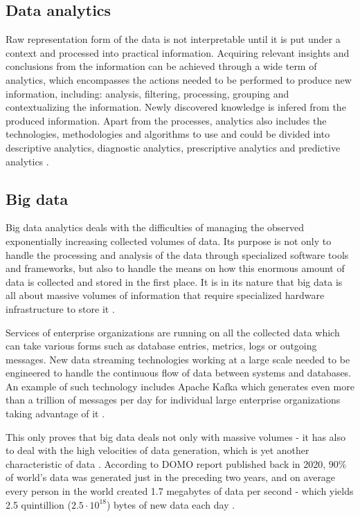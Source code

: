 \documentclass[a4paper,twoside,12pt]{book}
\begin{document}
\subsection{Data analytics}
Raw representation form of the data is not interpretable until it is put under a context and processed into practical information.
Acquiring relevant insights and conclusions from the information can be achieved through a wide term of analytics, which encompasses the actions needed to be performed to produce new information, including: analysis, filtering, processing, grouping and contextualizing the information. Newly discovered knowledge is infered from the produced information.
Apart from the processes, analytics also includes the technologies, methodologies and algorithms to use and could be divided into descriptive analytics, diagnostic analytics, prescriptive analytics and predictive analytics \cite{bib:big_data_analytics}.

\subsection{Big data}

Big data analytics deals with the difficulties of managing the observed exponentially increasing collected volumes of data. Its purpose is not only to handle the processing and analysis of the data through specialized software tools and frameworks, but also to handle the means on how this enormous amount of data is collected and stored in the first place. It is in its nature that big data is all about massive volumes of information that require specialized hardware infrastructure to store it \cite{bib:big_data_analytics}.

Services of enterprise organizations are running on all the collected data which can take various forms such as database entries, metrics, logs or outgoing messages. New data streaming technologies working at a large scale needed to be engineered to handle the continuous flow of data between systems and databases. An example of such technology includes Apache Kafka which generates even more than a trillion of messages per day for individual large enterprise organizations taking advantage of it \cite{bib:kafka_online}\cite{bib:kafka}.

This only proves that big data deals not only with massive volumes - it has also to deal with the high velocities of data generation, which is yet another characteristic of data \cite{bib:big_data_analytics}. According to DOMO report published back in 2020, 90\% of world's data was generated just in the preceding two years, and on average every person in the world created 1.7 megabytes of data per second - which yields 2.5 quintillion ($2.5 \cdot 10^{18}$) bytes of new data each day \cite{bib:domo}.
\end{document}
